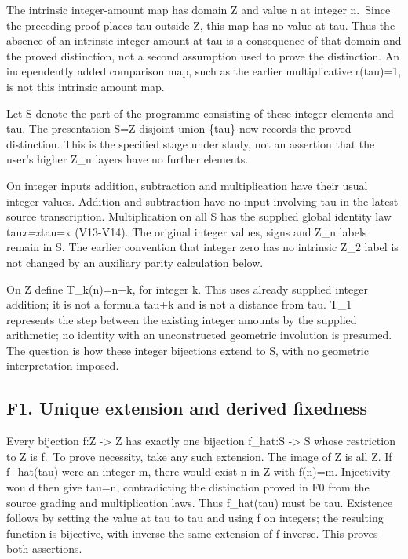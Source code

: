 \documentclass[
]{article}
\begin{document}
The intrinsic integer-amount map has domain Z and value n at integer
n.~Since the preceding proof places tau outside Z, this map has no value
at tau. Thus the absence of an intrinsic integer amount at tau is a
consequence of that domain and the proved distinction, not a second
assumption used to prove the distinction. An independently added
comparison map, such as the earlier multiplicative r(tau)=1, is not this
intrinsic amount map.

Let S denote the part of the programme consisting of these integer
elements and tau. The presentation S=Z disjoint union \{tau\} now
records the proved distinction. This is the specified stage under study,
not an assertion that the user's higher Z\_n layers have no further
elements.

On integer inputs addition, subtraction and multiplication have their
usual integer values. Addition and subtraction have no input involving
tau in the latest source transcription. Multiplication on all S has the
supplied global identity law tau\emph{x=x}tau=x (V13-V14). The original
integer values, signs and Z\_n labels remain in S. The earlier
convention that integer zero has no intrinsic Z\_2 label is not changed
by an auxiliary parity calculation below.

On Z define T\_k(n)=n+k, for integer k. This uses already supplied
integer addition; it is not a formula tau+k and is not a distance from
tau. T\_1 represents the step between the existing integer amounts by
the supplied arithmetic; no identity with an unconstructed geometric
involution is presumed. The question is how these integer bijections
extend to S, with no geometric interpretation imposed.

\subsection{F1. Unique extension and derived
fixedness}\label{f1.-unique-extension-and-derived-fixedness}

Every bijection f:Z -\textgreater{} Z has exactly one bijection f\_hat:S
-\textgreater{} S whose restriction to Z is f.~To prove necessity, take
any such extension. The image of Z is all Z. If f\_hat(tau) were an
integer m, there would exist n in Z with f(n)=m. Injectivity would then
give tau=n, contradicting the distinction proved in F0 from the source
grading and multiplication laws. Thus f\_hat(tau) must be tau. Existence
follows by setting the value at tau to tau and using f on integers; the
resulting function is bijective, with inverse the same extension of f
inverse. This proves both assertions.
\end{document}
